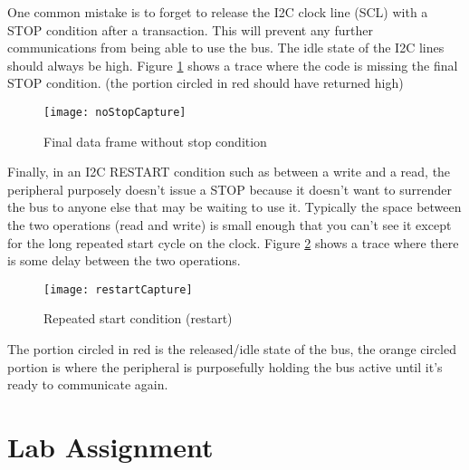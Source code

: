 \documentclass[11pt,fleqn]{book} %
\begin{document}
One common mistake is to forget to release the I2C clock line (SCL) with a STOP condition after a transaction. This will prevent any further communications from being able to use the bus. The idle state of the I2C lines should always be high. Figure \ref{noStopCapture} shows a trace where the code is missing the final STOP condition. (the portion circled in red should have returned high)


\begin{figure}[]
    \centering\texttt{[image: noStopCapture]}
    \caption{Final data frame without stop condition}
    \label{noStopCapture}
\end{figure}

Finally, in an I2C RESTART condition such as between a write and a read, the peripheral purposely doesn't issue a STOP because it doesn't want to surrender the bus to anyone else that may be waiting to use it. Typically the space between the two operations (read and write) is small enough that you can't see it except for the long repeated start cycle on the clock. Figure \ref{restartCapture} shows a trace where there is some delay between the two operations. 

\begin{figure}[]
    \centering\texttt{[image: restartCapture]}
    \caption{Repeated start condition (restart)}
    \label{restartCapture}
\end{figure}

The portion circled in red is the released/idle state of the bus, the orange circled portion is where the peripheral is purposefully holding the bus active until it's ready to communicate again.


\section{Lab Assignment}
\end{document}
